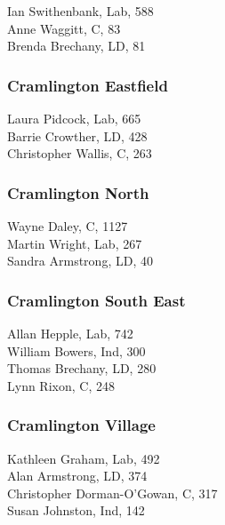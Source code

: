 \documentclass[a4paper,openany,10pt]{book}
\begin{document}


Ian Swithenbank, Lab, 588\\
Anne Waggitt, C, 83\\
Brenda Brechany, LD, 81\\


\subsubsection*{Cramlington Eastfield}



Laura Pidcock, Lab, 665\\
Barrie Crowther, LD, 428\\
Christopher Wallis, C, 263\\


\subsubsection*{Cramlington North}



Wayne Daley, C, 1127\\
Martin Wright, Lab, 267\\
Sandra Armstrong, LD, 40\\


\subsubsection*{Cramlington South East}



Allan Hepple, Lab, 742\\
William Bowers, Ind, 300\\
Thomas Brechany, LD, 280\\
Lynn Rixon, C, 248\\


\subsubsection*{Cramlington Village}



Kathleen Graham, Lab, 492\\
Alan Armstrong, LD, 374\\
Christopher Dorman-O'Gowan, C, 317\\
Susan Johnston, Ind, 142\\
\end{document}
